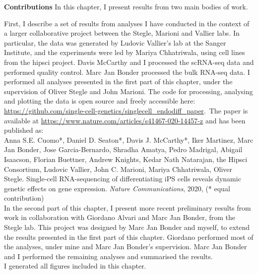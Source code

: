 \begin{Comment2}
\hspace{-3mm}\textbf{Contributions} 
In this chapter, I present results from two main bodies of work.

First, I describe a set of results from analyses I have conducted in the context of a larger collaborative project between the Stegle, Marioni and Vallier labs. 
In particular, the data was generated by Ludovic Vallier’s lab at the Sanger Institute, and the experiments were led by Mariya Chhatriwala, using cell lines from the \gls{hipsci} project.
Davis McCarthy and I processed the scRNA-seq data and performed quality control.
Marc Jan Bonder processed the bulk RNA-seq data.
I performed all analyses presented in the first part of this chapter, under the supervision of Oliver Stegle and John Marioni.
The code for processing, analysing and plotting the data is open source and freely accessible here: \url{https://github.com/single-cell-genetics/singlecell\_endodiff\_paper}.\
The paper 
is available at \url{https://www.nature.com/articles/s41467-020-14457-z} and has been published as:\\

Anna S.E. Cuomo*, Daniel D. Seaton*, Davis J. McCarthy*, Iker Martinez, Marc Jan Bonder, Jose Garcia-Bernardo, Shradha Amatya, Pedro Madrigal, Abigail Isaacson, Florian Buettner, Andrew Knights, Kedar Nath Natarajan, the Hipsci Consortium, Ludovic Vallier, John C. Marioni, Mariya Chhatriwala, Oliver Stegle. Single-cell RNA-sequencing of differentiating iPS cells reveals dynamic genetic effects on gene expression. \textit{Nature Communications}, 2020, (* equal contribution)\\


In the second part of this chapter, I present more recent preliminary results from work in collaboration with Giordano Alvari and Marc Jan Bonder, from the Stegle lab.
This project was designed by Marc Jan Bonder and myself, to extend the results presented in the first part of this chapter.
Giordano performed most of the analyses, under mine and Marc Jan Bonder's supervision.
Marc Jan Bonder and I performed the remaining analyses and summarised the results.\\

I generated all figures included in this chapter.
\end{Comment2}

